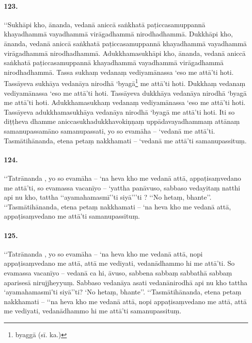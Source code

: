 \paragraph{123.} ‘‘Sukhāpi kho, ānanda, vedanā aniccā saṅkhatā paṭiccasamuppannā khayadhammā vayadhammā virāgadhammā nirodhadhammā. Dukkhāpi kho, ānanda, vedanā aniccā saṅkhatā paṭiccasamuppannā khayadhammā vayadhammā virāgadhammā nirodhadhammā. Adukkhamasukhāpi kho, ānanda, vedanā aniccā saṅkhatā paṭiccasamuppannā khayadhammā vayadhammā virāgadhammā nirodhadhammā. Tassa sukhaṃ vedanaṃ vediyamānassa ‘eso me attā’ti hoti. Tassāyeva sukhāya vedanāya nirodhā ‘byagā\footnote{byaggā (sī. ka.)} me attā’ti hoti. Dukkhaṃ vedanaṃ vediyamānassa ‘eso me attā’ti hoti. Tassāyeva dukkhāya vedanāya nirodhā ‘byagā me attā’ti hoti. Adukkhamasukhaṃ vedanaṃ vediyamānassa ‘eso me attā’ti hoti. Tassāyeva adukkhamasukhāya vedanāya nirodhā ‘byagā me attā’ti hoti. Iti so diṭṭheva dhamme aniccasukhadukkhavokiṇṇaṃ uppādavayadhammaṃ attānaṃ samanupassamāno samanupassati, yo so evamāha – ‘vedanā me attā’ti. Tasmātihānanda, etena petaṃ nakkhamati – ‘vedanā me attā’ti samanupassituṃ.

\paragraph{124.} ‘‘Tatrānanda , yo so evamāha – ‘na heva kho me vedanā attā, appaṭisaṃvedano me attā’ti, so evamassa vacanīyo – ‘yattha panāvuso, sabbaso vedayitaṃ natthi api nu kho, tattha ‘‘ayamahamasmī’’ti siyā’’’ti ? ‘‘No hetaṃ, bhante’’. ‘‘Tasmātihānanda, etena petaṃ nakkhamati – ‘na heva kho me vedanā attā, appaṭisaṃvedano me attā’ti samanupassituṃ.

\paragraph{125.} ‘‘Tatrānanda , yo so evamāha – ‘na heva kho me vedanā attā, nopi appaṭisaṃvedano me attā, attā me vediyati, vedanādhammo hi me attā’ti. So evamassa vacanīyo – vedanā ca hi, āvuso, sabbena sabbaṃ sabbathā sabbaṃ aparisesā nirujjheyyuṃ. Sabbaso vedanāya asati vedanānirodhā api nu kho tattha ‘ayamahamasmī’ti siyā’’ti? ‘No hetaṃ, bhante’’. ‘‘Tasmātihānanda, etena petaṃ nakkhamati – ‘‘na heva kho me vedanā attā, nopi appaṭisaṃvedano me attā, attā me vediyati, vedanādhammo hi me attā’ti samanupassituṃ.

